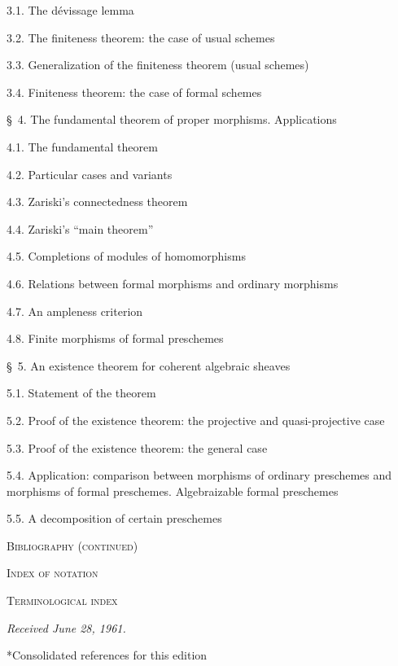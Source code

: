 \documentclass[oneside]{amsart}
\makeatletter
\theoremstyle{ega-env-style}
\theoremstyle{ega-thm-env-style}
\theoremstyle{ega-defn-env-style}
\def\section{\@startsection{section}{1}%
  \z@{.7\linespacing\@plus\linespacing}{.5\linespacing}%
  {\normalfont\bfseries\Large\scshape\centering}}
\newcommand{\oldpage}[2][]{{\marginnote{\normalfont{\textbf{#1}~|~#2}}}\ignorespaces}
\makeatother
\begin{document}
\begin{flushleft}
3.1. The dévissage lemma 

3.2. The finiteness theorem: the case of usual schemes 

3.3. Generalization of the finiteness theorem (usual schemes) 

3.4. Finiteness theorem: the case of formal schemes 

\medskip
\S~4. The fundamental theorem of proper morphisms. Applications 

4.1. The fundamental theorem 

4.2. Particular cases and variants 

4.3. Zariski's connectedness theorem 

4.4. Zariski's ``main theorem'' 

4.5. Completions of modules of homomorphisms 

4.6. Relations between formal morphisms and ordinary morphisms 

4.7. An ampleness criterion 

4.8. Finite morphisms of formal preschemes 

\oldpage[III]{167}

\S~5. An existence theorem for coherent algebraic sheaves 

5.1. Statement of the theorem 

5.2. Proof of the existence theorem: the projective and quasi-projective case

5.3. Proof of the existence theorem: the general case 

5.4. Application: comparison between morphisms of ordinary preschemes and
morphisms of formal preschemes. Algebraizable formal preschemes 

5.5. A decomposition of certain preschemes 

\medskip
\textsc{Bibliography (continued)} 

\textsc{Index of notation} 

\textsc{Terminological index} 

\begin{flushright}
\emph{Received June 28, 1961.}
\end{flushright}
\end{flushleft}

\clearpage
{}
{}
\section*{Consolidated references for this edition}


\end{document}
